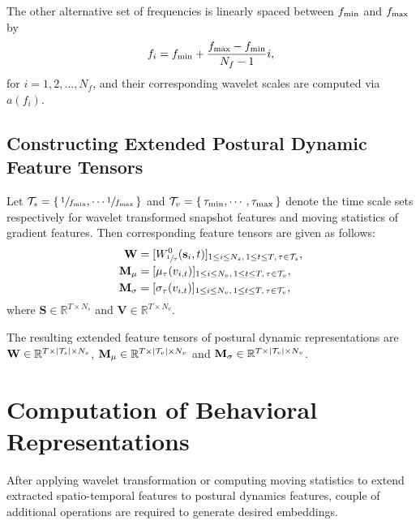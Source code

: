 The other alternative set of frequencies is linearly spaced between $f_{\textnormal{min}}$ and $f_{\textnormal{max}}$ by
\begin{equation}
	f_i = f_{\textnormal{min}} + \frac{f_{\textnormal{max}} - f_{\textnormal{min}}}{N_f-1}i,
\end{equation}
for $i=1,2,\dots,N_f$, and their corresponding wavelet scales are computed via $a(f_i)$.

\subsection{Constructing Extended Postural Dynamic Feature Tensors}
Let $\mathcal{T}_s=\{\,\sfrac{1}{f_{\textnormal{min}}}, \cdots \sfrac{1}{f_{\textnormal{max}}}\,\}$ and $\mathcal{T}_v=\{\,\tau_{\textnormal{min}}, \cdots, \tau_{\textnormal{max}}\,\}$ denote the time scale sets respectively for wavelet transformed snapshot features and moving statistics of gradient features. Then corresponding feature tensors are given as follows:
\begin{align}
	\mathbf{W}        & = [W^0_{\sfrac{1}{\tau}}(\mathbf{s}_i, t)]_{1 \leq i \leq N_s, \,1 \leq t \leq T, \, \tau \in \mathcal{T}_s}, \\
	\mathbf{M}_\mu    & = [\mu_\tau(v_{i,t})]_{1 \leq i \leq  N_v,  \, 1\leq t \leq T, \, \tau \in \mathcal{T}_v},                    \\
	\mathbf{M}_\sigma & = [\sigma_\tau(v_{i,t})]_{1 \leq i \leq N_v, \, 1\leq t \leq T, \, \tau \in \mathcal{T}_v},
\end{align}
where $\mathbf{S} \in \mathbb{R}^{T \times N_s}$ and $\mathbf{V} \in \mathbb{R}^{T \times N_v}$.

The resulting extended feature tensors of postural dynamic representations are $\mathbf{W} \in \mathbb{R}^{T \times \lvert\mathcal{T}_s\rvert \times N_s}$, $\mathbf{M}_\mu \in \mathbb{R}^{T \times \lvert\mathcal{T}_v\rvert \times N_v}$ and $\mathbf{M}_\sigma \in \mathbb{R}^{T \times \lvert\mathcal{T}_v\rvert \times N_v}$.
\section{Computation of Behavioral Representations}
After applying wavelet transformation or computing moving statistics to extend extracted spatio-temporal features to postural dynamics features, couple of additional operations are required to generate desired embeddings.

